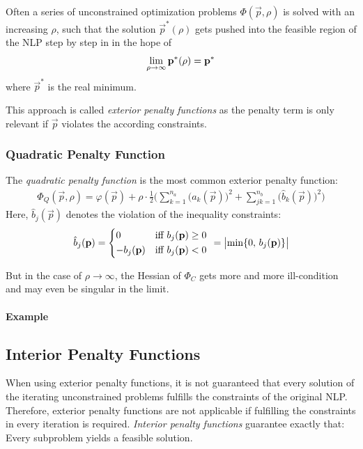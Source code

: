			Often a series of unconstrained optimization problems \( \Phi(\vec{p}, \rho) \) is solved with an increasing \(\rho\), such that the solution \( \vec{p}^\ast(\rho) \) gets pushed into the feasible region of the NLP step by step in in the hope of
			\begin{align*}
				\liminfty[\rho] \vec{p}^\ast(\rho) = \vec{p}^\ast
			\end{align*}
			where \( \vec{p}^\ast \) is the real minimum.
			
			This approach is called \emph{exterior penalty functions} as the penalty term is only relevant if \( \vec{p} \) violates the according constraints.
			
			\subsubsection{Quadratic Penalty Function}
				The \emph{quadratic penalty function} is the most common exterior penalty function:
				\begin{align*}
					\Phi_Q(\vec{p}, \rho) = \varphi(\vec{p}) + \rho \cdot \frac{1}{2} \Bigg( \sum_{k = 1}^{n_a} \big(a_k(\vec{p})\big)^2 + \sum_{jk = 1}^{n_b} \big(\hat{b}_k(\vec{p})\big)^2 \Bigg)
				\end{align*}
				Here, \( \hat{b}_j(\vec{p}) \) denotes the violation of the inequality constraints:
				\begin{align*}
					\hat{b}_j(\vec{p}) =
						\begin{cases*}
							0             & iff \( b_j(\vec{p}) \geq 0 \) \\
							-b_j(\vec{p}) & iff \( b_j(\vec{p}) < 0 \)
						\end{cases*}
					= \big\lvert\! \min\{ 0,\, b_j(\vec{p}) \} \big\rvert
				\end{align*}
				
				But in the case of \( \rho \to \infty \), the Hessian of \( \Phi_C \) gets more and more ill-condition and may even be singular in the limit.

			\paragraph{Example} %

		\subsection{Interior Penalty Functions}
			When using exterior penalty functions, it is not guaranteed that every solution of the iterating unconstrained problems fulfills the constraints of the original NLP. Therefore, exterior penalty functions are not applicable if fulfilling the constraints in every iteration is required. \emph{Interior penalty functions} guarantee exactly that: Every subproblem yields a feasible solution.
			
